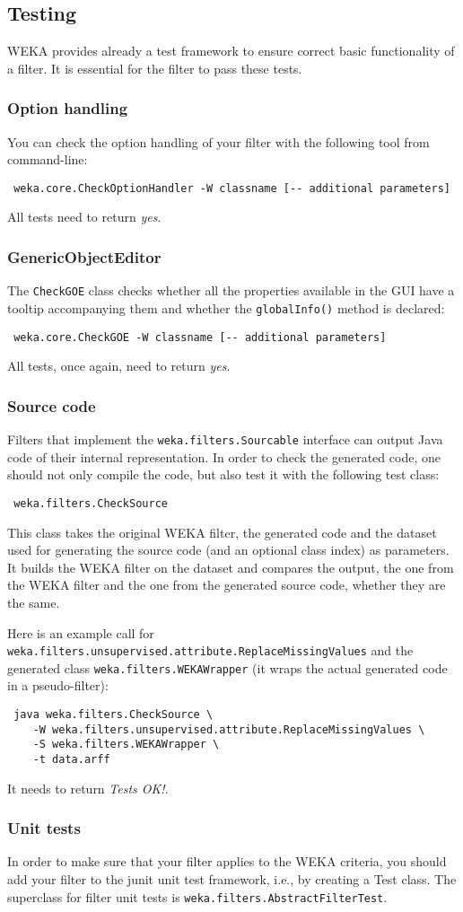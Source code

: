 \newpage
\subsection{Testing}
WEKA provides already a test framework to ensure correct basic functionality of
a filter. It is essential for the filter to pass these tests.

\subsubsection{Option handling}
You can check the option handling of your filter with the following tool from
command-line:
\begin{verbatim}
 weka.core.CheckOptionHandler -W classname [-- additional parameters]
\end{verbatim}
All tests need to return \textit{yes}.

\subsubsection{GenericObjectEditor}
The \texttt{CheckGOE} class checks whether all the properties available in the
GUI have a tooltip accompanying them and whether the \texttt{globalInfo()}
method is declared:
\begin{verbatim}
 weka.core.CheckGOE -W classname [-- additional parameters]
\end{verbatim}
All tests, once again, need to return \textit{yes}.

\subsubsection{Source code}
Filters that implement the \texttt{weka.filters.Sourcable} interface can output
Java code of their internal representation. In order to check the generated
code, one should not only compile the code, but also test it with the following
test class:
\begin{verbatim}
 weka.filters.CheckSource
\end{verbatim}
This class takes the original WEKA filter, the generated code and the dataset
used for generating the source code (and an optional class index) as parameters.
It builds the WEKA filter on the dataset and compares the output, the one from
the WEKA filter and the one from the generated source code, whether they are the
same.

Here is an example call for
\texttt{weka.filters.unsupervised.attribute.ReplaceMissingValues} and the
generated class \texttt{weka.filters.WEKAWrapper} (it wraps the actual generated
code in a pseudo-filter):
\begin{verbatim}
 java weka.filters.CheckSource \
    -W weka.filters.unsupervised.attribute.ReplaceMissingValues \
    -S weka.filters.WEKAWrapper \
    -t data.arff
\end{verbatim}
It needs to return \textit{Tests OK!}.

\subsubsection{Unit tests}
In order to make sure that your filter applies to the WEKA criteria, you
should add your filter to the junit unit test framework, i.e., by creating a
Test class. The superclass for filter unit tests is
\texttt{weka.filters.AbstractFilterTest}.

